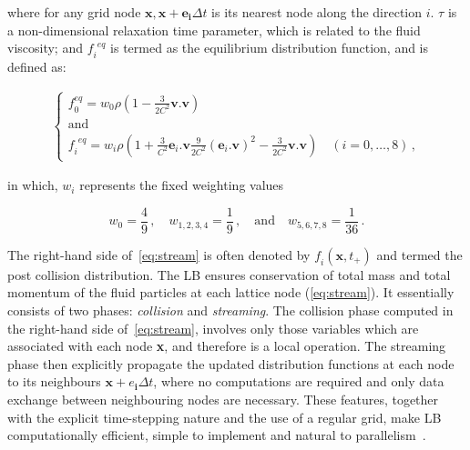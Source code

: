 \noindent where for any grid node $\mathbf{x},\mathbf{x}+\mathbf{e_i} \Delta t$ 
is its nearest node along the direction $\mathit{i}$. $\tau$ is a 
non-dimensional relaxation time parameter, which is related to the fluid 
viscosity; and $\mathit{f_i}^{\mathit{eq}}$ is termed as the equilibrium 
distribution function, and is defined as:

\begin{align}
	\begin{cases}
	\mathit{f}_{\mathit{0}}^{\mathit{eq}} = \mathit{w}_{\mathit{0}} \rho (1 - 
	\frac{3}{2\mathit{C}^{\mathit{2}}}\mathbf{v}.\mathbf{v}) \\ 
	\mbox{and}\\
	\mathit{f_i}^{\mathit{eq}} = \mathit{w_i} \rho (1 + 
	\frac{3}{\mathit{C}^{\mathit{2}}}\mathbf{e}_{\mathit{i}}.\mathbf{v} 
	\frac{9}{2\mathit{C}^{\mathit{2}}} 
	(\mathbf{e}_{\mathit{i}}.\mathbf{v})^{\mathit{2}}-\frac{3}{2 
	\mathit{C}^{\mathit{2}}}\mathbf{v}.\mathbf{v}) \quad 
	(\mathit{i}=0,\dots,8)\,,
	\end{cases}
\end{align}

\noindent in which, $\mathit{w_i}$ represents the fixed weighting values

\begin{equation}
	\mathit{w}_{\mathit{0}} = \frac{4}{9}\,, \quad 
	\mathit{w}_{\mathit{1,2,3,4}}= 
	\frac{1}{9}\,, \quad \mbox{and} \quad \mathit{w}_{\mathit{5,6,7,8}}= 
	\frac{1}{36}\,.
\end{equation}

The right-hand side of~\cref{eq:stream} is often denoted by 
$\mathit{f_i}(\mathbf{x}, \mathit{t}_{+})$ and termed the post collision 
distribution. The LB ensures conservation of total mass and total momentum of 
the fluid particles at each lattice node (\cref{eq:stream}). It essentially 
consists of two phases: \textit{collision} and \textit{streaming}. The 
collision phase computed in the right-hand side of~\cref{eq:stream}, involves 
only those variables which are associated with each node \textbf{x}, and 
therefore is a local operation. The streaming phase then explicitly propagate 
the updated distribution functions at each node to its neighbours 
$\mathbf{x}+\mathbf{\mathit{e}_i} \Delta t$, where no computations are required 
and only data exchange between neighbouring nodes are necessary. These 
features, together with the explicit time-stepping nature and the use of a 
regular grid, make LB computationally efficient, simple to implement and 
natural to parallelism~\citep{Han2007}. 

